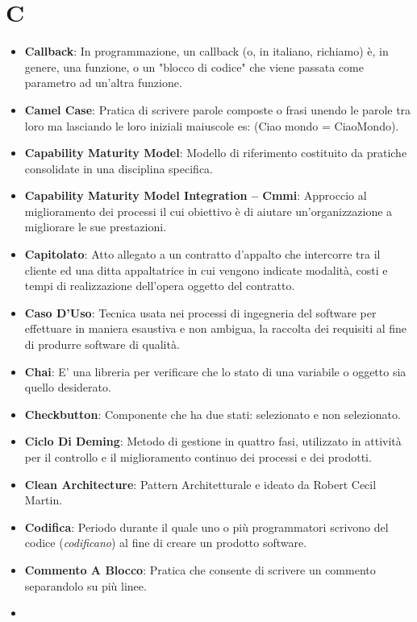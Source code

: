 \section*{C}
\begin{itemize}
	\item
	\textbf{Callback}: In programmazione, un callback (o, in italiano, richiamo) è, in genere, una funzione, o un "blocco di codice" che viene passata come parametro ad un'altra funzione.
	\item
	\textbf{Camel Case}: Pratica di scrivere parole composte o frasi unendo le parole tra loro ma lasciando le loro iniziali maiuscole es: (Ciao mondo = CiaoMondo).
	\item
	\textbf{Capability Maturity Model}: Modello di riferimento costituito da pratiche consolidate in una disciplina specifica.
	\item
	\textbf{Capability Maturity Model Integration -- Cmmi}: Approccio al miglioramento dei processi il cui obiettivo è di aiutare un'organizzazione a migliorare le sue prestazioni.
	\item
	\textbf{Capitolato}: Atto allegato a un contratto d'appalto che intercorre tra il cliente ed una ditta appaltatrice in cui vengono indicate modalità, costi e tempi di realizzazione dell'opera oggetto del contratto.
	\item
	\textbf{Caso D'Uso}: Tecnica usata nei processi di ingegneria del software per effettuare in maniera esaustiva e non ambigua, la raccolta dei requisiti al fine di produrre software di qualità.
	\item
	\textbf{Chai}: E' una libreria per verificare che lo stato di una variabile o oggetto sia quello desiderato.
	\item
	\textbf{Checkbutton}: Componente che ha due stati: selezionato e non selezionato.
	\item
	\textbf{Ciclo Di Deming}: Metodo di gestione in quattro fasi, utilizzato in attività per il controllo e il miglioramento continuo dei processi e dei prodotti.
	\item
	\textbf{Clean Architecture}: Pattern Architetturale e ideato da Robert Cecil Martin.
	\item
	\textbf{Codifica}: Periodo durante il quale uno o più programmatori scrivono del codice (\textit{codificano}) al fine di creare un prodotto software.
	\item
	\textbf{Commento A Blocco}: Pratica che consente di scrivere un commento separandolo su più linee.
	\item

\end{itemize}
